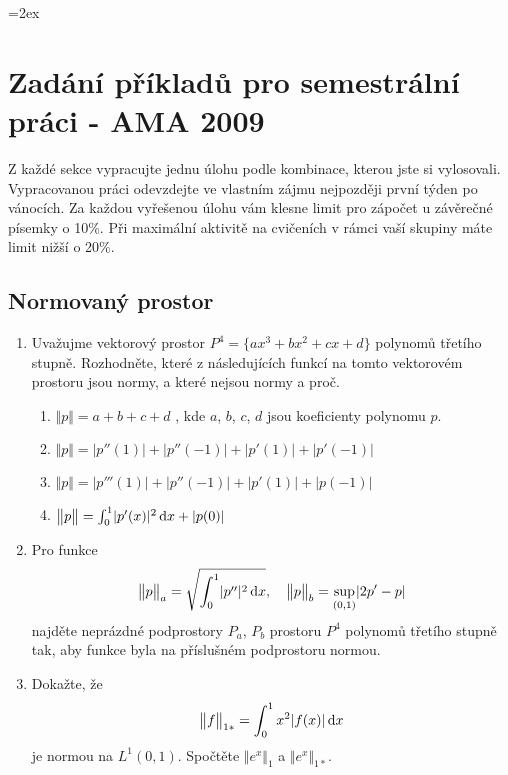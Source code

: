 \documentclass[a4paper,10pt]{article}
\def\d{\,{\rm d}}               %
\def\dx{\d x}
\def\abs#1{\lvert#1\rvert}
\def\norm#1{\bigl\Vert#1\bigr\Vert} %
\begin{document}
\parskip=2ex
\parindent=0pt
\pagestyle{empty}
 \section{Zadání příkladů pro semestrální práci - AMA 2009}
 Z každé sekce vypracujte jednu úlohu podle kombinace, kterou jste si vylosovali. Vypracovanou práci odevzdejte ve vlastním zájmu nejpozději první týden po vánocích. Za každou vyřešenou úlohu vám klesne limit pro zápočet u závěrečné písemky o 10\%.
 Při maximální aktivitě na cvičeních v rámci vaší skupiny máte limit nižší o 20\%.
 \subsection{Normovaný prostor}
 \begin{enumerate}
  \item Uvažujme vektorový prostor $P^4=\{ax^3+bx^2+cx+d\}$ polynomů třetího stupně. Rozhodněte, které z následujících
        funkcí na tomto vektorovém prostoru jsou normy, a které nejsou normy a proč.
   \begin{enumerate}
       \item $\norm{p}=a+b+c+d$ , kde $a$, $b$, $c$, $d$ jsou koeficienty polynomu $p$.
       \item $\norm{p}=\abs{p''(1)}+\abs{p''(-1)}+\abs{p'(1)}+\abs{p'(-1)}$
       \item $\norm{p}=\abs{p'''(1)}+\abs{p''(-1)}+\abs{p'(1)}+\abs{p(-1)}$
       \item $\norm{p}=\int_0^1\abs{p'(x)}^2\dx+\abs{p(0)}$
   \end{enumerate}
  \item Pro funkce 
       \[
        \norm{p}_a=\sqrt{\int_0^1 \abs{p''}^2 \dx},\quad \norm{p}_b=\sup_{(0,1)} \abs{2p'-p}
       \] 
       najděte neprázdné podprostory $P_a$, $P_b$ prostoru $P^4$ polynomů třetího stupně tak, aby funkce byla na příslušném podprostoru normou. 
  \item Dokažte, že 
        \[
                \norm{f}_{1*}=\int_0^1 x^2 \abs{f(x)} \dx 
        \]
        je normou na $L^1(0,1)$. Spočtěte $\norm{e^x}_1$ a $\norm{e^x}_{1*}$.   
 \end{enumerate}
\end{document}
